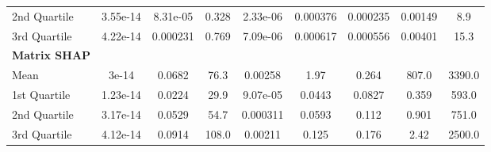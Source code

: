 {\begin{tabular} {lcccccccc}
\hspace{7pt}2nd Quartile & \cellcolor{bronze!60}3.55e-14 & \cellcolor{gold!60}8.31e-05 & \cellcolor{gold!60}0.328 & \cellcolor{gold!60}2.33e-06 & \cellcolor{gold!60}0.000376 & \cellcolor{gold!60}0.000235 & \cellcolor{gold!60}0.00149 & \cellcolor{gold!60}8.9 \\ 
\hspace{7pt}3rd Quartile & \cellcolor{bronze!60}4.22e-14 & \cellcolor{gold!60}0.000231 & \cellcolor{gold!60}0.769 & \cellcolor{gold!60}7.09e-06 & \cellcolor{gold!60}0.000617 & \cellcolor{gold!60}0.000556 & \cellcolor{gold!60}0.00401 & \cellcolor{gold!60}15.3 \\ 
\addlinespace[1ex] 
\textbf{Matrix SHAP} &  &  &  &  &  &  &  &  \\ 
\hspace{7pt}Mean & \cellcolor{gold!60}3e-14 & \cellcolor{bronze!60}0.0682 & \cellcolor{bronze!60}76.3 & \cellcolor{bronze!60}0.00258 & \cellcolor{bronze!60}1.97 & \cellcolor{bronze!60}0.264 & \cellcolor{bronze!60}807.0 & \cellcolor{bronze!60}3390.0 \\ 
\hspace{7pt}1st Quartile & \cellcolor{gold!60}1.23e-14 & \cellcolor{bronze!60}0.0224 & \cellcolor{bronze!60}29.9 & \cellcolor{bronze!60}9.07e-05 & \cellcolor{bronze!60}0.0443 & \cellcolor{bronze!60}0.0827 & \cellcolor{bronze!60}0.359 & \cellcolor{bronze!60}593.0 \\ 
\hspace{7pt}2nd Quartile & \cellcolor{gold!60}3.17e-14 & \cellcolor{bronze!60}0.0529 & \cellcolor{bronze!60}54.7 & \cellcolor{bronze!60}0.000311 & \cellcolor{bronze!60}0.0593 & \cellcolor{bronze!60}0.112 & \cellcolor{bronze!60}0.901 & \cellcolor{bronze!60}751.0 \\ 
\hspace{7pt}3rd Quartile & \cellcolor{gold!60}4.12e-14 & \cellcolor{bronze!60}0.0914 & \cellcolor{bronze!60}108.0 & \cellcolor{bronze!60}0.00211 & \cellcolor{bronze!60}0.125 & \cellcolor{bronze!60}0.176 & \cellcolor{bronze!60}2.42 & \cellcolor{bronze!60}2500.0 \\ 
\bottomrule
\end{tabular}}